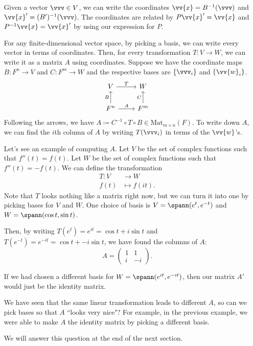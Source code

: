Given a vector $\vvv \in V$, we can write the coordinates $\vv{x} = B^{-1}(\vvv)$ and $\vv{x}' = (B')^{-1} (\vvv)$. The coordinates are related by $P\vv{x}' = \vv{x}$ and $P^{-1}\vv{x} = \vv{x}'$ by using our expression for $P$.

For any finite-dimensional vector space, by picking a basis, we can write every vector in terms of coordinates. 
Then, for every transformation $T: V \rightarrow W$, we can write it as a matrix $A$ using coordinates. 
Suppose we have the coordinate maps $B: F^n \rightarrow V$ and $C : F^m \rightarrow W$ and the respective bases are $\{ \vvv_i\}$ and $\{ \vv{w}_i \}$.
\[
\begin{tikzcd}
V \arrow[r, "T"] & W \\
F^n \arrow[u, "B"]\arrow[r, "A"] & F^m \arrow[u, "C"]
\end{tikzcd}
\]
Following the arrows, we have $A \coloneqq C^{-1} \circ T \circ B \in \text{Mat}_{m\times n}(F)$.
To write down $A$, we can find the $i$th column of $A$ by writing $T(\vvv_i)$ in terms of the $\vv{w}$'s.

\begin{example} 
    Let's see an example of computing $A$.
    Let $V$ be the set of complex functions such that $f''(t) = f(t)$.
    Let $W$ be the set of complex functions such that $f''(t) = -f(t)$. 
    We can define the transformation 
    \begin{align*}
        T:V &\rightarrow W \\
        f(t) &\mapsto f(it) .
    \end{align*}
    Note that $T$ looks nothing like a matrix right now, but we can turn it into one by picking bases for $V$ and $W$. One choice of basis is $V = \spann(e^t, e^{-t})$ and $W = \spann(\cos t, \sin t)$. 

    Then, by writing $T(e^t) = e^{it} = \cos t + i \sin t$ and $T(e^{-t}) = e^{-it} = \cos t + -i \sin t$, we have found the columns of $A$:
    \[A = \begin{pmatrix} 1 & 1 \\ i & -i \end{pmatrix} .\]

    If we had chosen a different basis for $W = \spann(e^{it}, e^{-it})$, then our matrix $A'$ would just be the identity matrix.

\end{example}


\begin{qq}
    We have seen that the same linear transformation leads to different $A$, so can we pick bases so that $A$ ``looks very nice"? For example, in the previous example, we were able to make $A$ the identity matrix by picking a different basis. 
\end{qq}
We will answer this question at the end of the next section.
